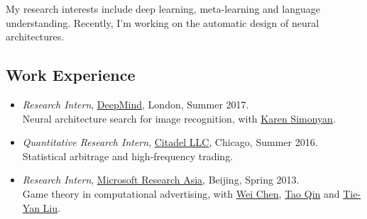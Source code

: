 \documentclass{article}
\begin{document}
\noindent
My research interests include deep learning, meta-learning and language understanding.
Recently, I'm working on the automatic design of neural architectures.


\subsection*{Work Experience}
\begin{itemize}
	\item \emph{Research Intern}, \href{https://deepmind.com/}{DeepMind}, London, Summer 2017. \\
		Neural architecture search for image recognition, with \href{http://www.robots.ox.ac.uk/~karen/}{Karen Simonyan}.
	\item \emph{Quantitative Research Intern}, \href{https://www.citadel.com/}{Citadel LLC}, Chicago, Summer 2016. \\
		Statistical arbitrage and high-frequency trading.
	\item \emph{Research Intern}, \href{http://research.microsoft.com/en-us/labs/asia/}{Microsoft Research Asia}, Beijing, Spring 2013. \\
		Game theory in computational advertising,
		with \href{https://www.microsoft.com/en-us/research/people/wche/}{Wei Chen},
		\href{https://www.microsoft.com/en-us/research/people/taoqin/}{Tao Qin} and \href{https://www.microsoft.com/en-us/research/people/tyliu/}{Tie-Yan Liu}.
\end{itemize}
\end{document}
